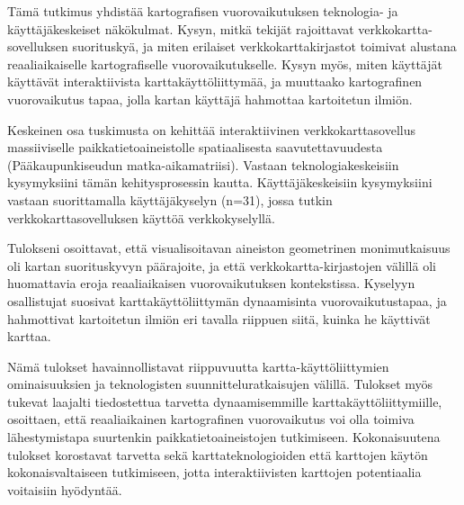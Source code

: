 \begin{spacing}{1}
Tämä tutkimus yhdistää kartografisen vuorovaikutuksen teknologia- ja käyttäjäkeskeiset näkökulmat.
Kysyn, mitkä tekijät rajoittavat verkkokartta-sovelluksen suorituskyä,
ja miten erilaiset verkkokarttakirjastot toimivat alustana reaaliaikaiselle kartografiselle vuorovaikutukselle.
Kysyn myös, miten käyttäjät käyttävät interaktiivista karttakäyttöliittymää,
ja muuttaako kartografinen vuorovaikutus tapaa, jolla kartan käyttäjä hahmottaa kartoitetun ilmiön.

Keskeinen osa tuskimusta on kehittää interaktiivinen verkkokarttasovellus
massiiviselle paikkatietoaineistolle spatiaalisesta saavutettavuudesta (Pääkaupunkiseudun matka-aikamatriisi).
Vastaan teknologiakeskeisiin kysymyksiini tämän kehitysprosessin kautta.
Käyttäjäkeskeisiin kysymyksiini vastaan suorittamalla käyttäjäkyselyn (n=31),
jossa tutkin verkkokarttasovelluksen käyttöä verkkokyselyllä.

Tulokseni osoittavat, että visualisoitavan aineiston geometrinen monimutkaisuus
oli kartan suorituskyvyn päärajoite, ja että verkkokartta-kirjastojen välillä oli
huomattavia eroja reaaliaikaisen vuorovaikutuksen kontekstissa.
Kyselyyn osallistujat suosivat karttakäyttöliittymän dynaamisinta vuorovaikutustapaa,
ja hahmottivat kartoitetun ilmiön eri tavalla riippuen siitä, kuinka he käyttivät karttaa.

Nämä tulokset havainnollistavat riippuvuutta kartta-käyttöliittymien ominaisuuksien
ja teknologisten suunnitteluratkaisujen välillä.
Tulokset myös tukevat laajalti tiedostettua tarvetta dynaamisemmille karttakäyttöliittymiille,
osoittaen, että reaaliaikainen kartografinen vuorovaikutus voi olla toimiva lähestymistapa suurtenkin
paikkatietoaineistojen tutkimiseen.
Kokonaisuutena tulokset korostavat tarvetta
sekä karttateknologioiden että karttojen käytön kokonaisvaltaiseen tutkimiseen,
jotta interaktiivisten karttojen potentiaalia voitaisiin hyödyntää.

\end{spacing}
